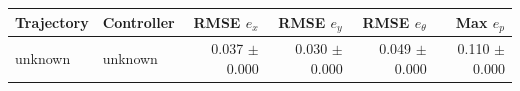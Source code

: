 \begin{tabular}{llrrrr}
\hline
Trajectory & Controller & RMSE $e_x$ & RMSE $e_y$ & RMSE $e_\theta$ & Max $e_p$ \\
\hline
unknown & unknown & 0.037 $\pm$ 0.000 & 0.030 $\pm$ 0.000 & 0.049 $\pm$ 0.000 & 0.110 $\pm$ 0.000 \\
\hline
\end{tabular}
